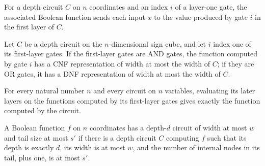 \begin{definition}
\label{FABL.DepthCircuit.layer1Function}
\leanok
{}
For a depth circuit $C$ on $n$ coordinates and an index $i$ of a layer-one gate, the
associated Boolean function sends each input $x$ to the value produced by gate $i$ in
the first layer of $C$.
\end{definition}

\begin{theorem}
\label{FABL.DepthCircuit.layer1Function_hasWidthLE}
\leanok
{}
Let $C$ be a depth circuit on the $n$-dimensional sign cube, and let $i$ index one of
its first-layer gates. If the first-layer gates are AND gates, the function computed by
gate $i$ has a CNF representation of width at most the width of $C$; if they are OR
gates, it has a DNF representation of width at most the width of $C$.
\end{theorem}

\begin{theorem}
\label{FABL.DepthCircuit.evalFunction_layer1}
\leanok
{}
For every natural number $n$ and every circuit on $n$ variables, evaluating its later
layers on the functions computed by its first-layer gates gives exactly the function
computed by the circuit.
\end{theorem}

\begin{definition}
\label{FABL.DepthCircuit.HasDepthWidthTailSizeCircuit}
\leanok
{}
A Boolean function $f$ on $n$ coordinates has a depth-$d$ circuit of width at most $w$
and tail size at most $s'$ if there is a depth circuit $C$ computing $f$ such that its
depth is exactly $d$, its width is at most $w$, and the number of internal nodes in its
tail, plus one, is at most $s'$.
\end{definition}

